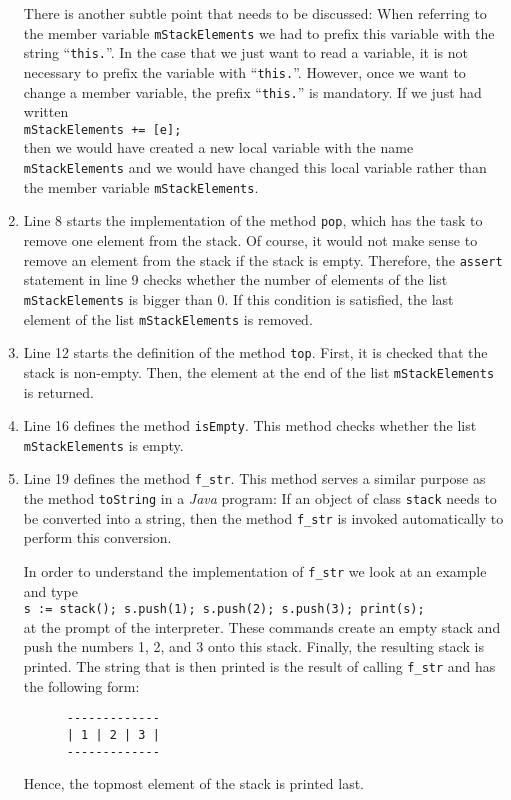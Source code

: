 \begin{enumerate}
      There is another subtle point that needs to be discussed: When referring to the member
      variable \texttt{mStackElements} we had to prefix this variable with the string
      ``\texttt{this.}''.  In the case that we just want to read a variable, it is not necessary to
      prefix the variable with ``\texttt{this.}''.  However, once we want to change a member
      variable, the prefix ``\texttt{this.}'' is mandatory.  If we just had written
      \\[0.2cm]
      \hspace*{1.3cm}
      \texttt{mStackElements += [e];}
      \\[0.2cm]
      then we would have created a new local variable with the name \texttt{mStackElements} and we
      would have changed this local variable rather than the member variable \texttt{mStackElements}.      
\item Line 8 starts the implementation of the method \texttt{pop}, which has the task to remove 
      one element from the stack.  Of course, it would not make sense to remove an element from the
      stack if the stack is empty.  Therefore, the \texttt{assert} statement in line 9 checks
      whether the number of elements of the list \texttt{mStackElements} is bigger than $0$.
      If this condition is satisfied, the last element of the list \texttt{mStackElements} is removed.
\item Line 12 starts the definition of the method \texttt{top}.  First, it is checked that the stack
      is non-empty.  Then, the element at the end of the list \texttt{mStackElements} is returned.
\item Line 16 defines the method \texttt{isEmpty}.  This method checks whether the list
      \texttt{mStackElements} is empty.
\item Line 19 defines the method \texttt{f\_str}.  This method serves a similar purpose as the method
      \texttt{toString} in a \textsl{Java} program:  If an object of class \texttt{stack} needs to
      be converted into a string, then the method \texttt{f\_str} is invoked automatically to
      perform this conversion.

      In order to understand the implementation of \texttt{f\_str} we look at an example and type
      \\[0.2cm]
      \hspace*{1.3cm}
      \texttt{s := stack(); s.push(1); s.push(2); s.push(3); print(s);}
      \\[0.2cm]
      at the prompt of the interpreter.  These commands create an empty stack and push the numbers 1, 2, and 3 
      onto this stack.  Finally, the resulting stack is printed.  The string that is then printed
      is the result of calling \texttt{f\_str} and has the following form:
      \begin{verbatim}
      -------------
      | 1 | 2 | 3 |
      -------------
      \end{verbatim}
      \vspace*{-0.5cm}
      Hence, the topmost element of the stack is printed last.


\end{enumerate}
